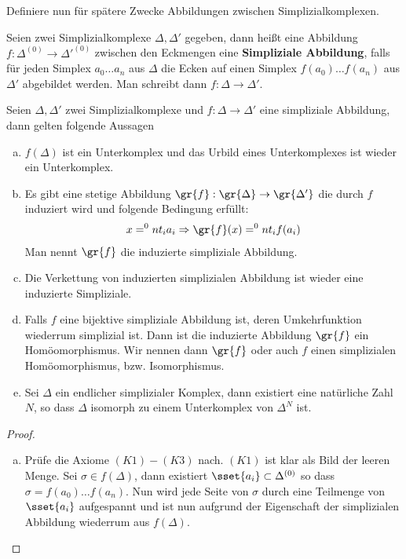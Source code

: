 Definiere nun für spätere Zwecke Abbildungen zwischen Simplizialkomplexen.

\begin{Def} 
  Seien zwei Simplizialkomplexe $\Delta, \Delta'$ gegeben, dann heißt
  eine Abbildung $f: \Delta^{(0)} \rightarrow \Delta'^{(0)}$ zwischen
  den Eckmengen eine \textbf{Simpliziale Abbildung}, falls für jeden
  Simplex $a_0 \ldots a_n$ aus $\Delta$ die Ecken auf einen Simplex
  $f(a_0) \ldots f(a_n)$ aus $\Delta'$ abgebildet werden. Man schreibt
  dann $f: \Delta \rightarrow \Delta'$.
\end{Def}


\begin{Satz}
  Seien $\Delta, \Delta'$ zwei Simplizialkomplexe und
  $f: \Delta \rightarrow \Delta'$ eine simpliziale Abbildung, dann
  gelten folgende Aussagen
	\begin{enumerate}[(a)]
        \item $f(\Delta)$ ist ein Unterkomplex und das Urbild eines
          Unterkomplexes ist wieder ein Unterkomplex.
        \item Es gibt eine stetige Abbildung
          $\gr{f} : \gr{\Delta} \rightarrow \gr{\Delta'}$ die durch
          $f$ induziert wird und folgende Bedingung erfüllt:
          \begin{gather*}
            x = \sp{0}{n} t_i a_i \Rightarrow \gr{f}(x) = \sp{0}{n}
            t_i f(a_i)
          \end{gather*}
          Man nennt $\gr{f}$ die induzierte simpliziale Abbildung.
        \item Die Verkettung von induzierten simplizialen Abbildung
          ist wieder eine induzierte Simpliziale.
        \item Falls $f$ eine bijektive simpliziale Abbildung ist,
          deren Umkehrfunktion wiederrum simplizial ist. Dann ist die
          induzierte Abbildung $\gr{f}$ ein Homöomorphismus. Wir
          nennen dann $\gr{f}$ oder auch $f$ einen simplizialen
          Homöomorphismus, bzw. Isomorphismus.
        \item Sei $\Delta$ ein endlicher simplizialer Komplex, dann
          existiert eine natürliche Zahl $N$, so dass $\Delta$
          isomorph zu einem Unterkomplex von $\Delta^N$ ist.
	\end{enumerate}
	\begin{proof}
          \begin{enumerate}[(a)]
          \item Prüfe die Axiome $(K1)-(K3)$ nach. $(K1)$ ist klar als
            Bild der leeren Menge. Sei $\sigma \in f(\Delta)$, dann
            existiert $\sset{a_i} \subset \Delta^{(0)}$ so dass
            $\sigma = f(a_0)\ldots f(a_n)$. Nun wird jede Seite von
            $\sigma$ durch eine Teilmenge von $\sset{a_i}$ aufgespannt
            und ist nun aufgrund der Eigenschaft der simplizialen
            Abbildung wiederrum aus $f(\Delta)$. 


\end{enumerate}
\end{proof}
\end{Satz}
